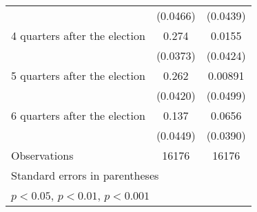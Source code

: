 \begin{table}[htbp]
\begin{tabular}{l*{2}{c}}
                    &    (0.0466)         &    (0.0439)         \\
[1em]
 4 quarters after the election&       0.274\sym{***}&      0.0155         \\
                    &    (0.0373)         &    (0.0424)         \\
[1em]
 5 quarters after the election&       0.262\sym{***}&     0.00891         \\
                    &    (0.0420)         &    (0.0499)         \\
[1em]
 6 quarters after the election&       0.137\sym{**} &      0.0656         \\
                    &    (0.0449)         &    (0.0390)         \\
\hline
Observations        &       16176         &       16176         \\
\hline\hline
\multicolumn{3}{l}{\footnotesize Standard errors in parentheses}\\
\multicolumn{3}{l}{\footnotesize \sym{*} \(p<0.05\), \sym{**} \(p<0.01\), \sym{***} \(p<0.001\)}\\
\end{tabular}
\end{table}
